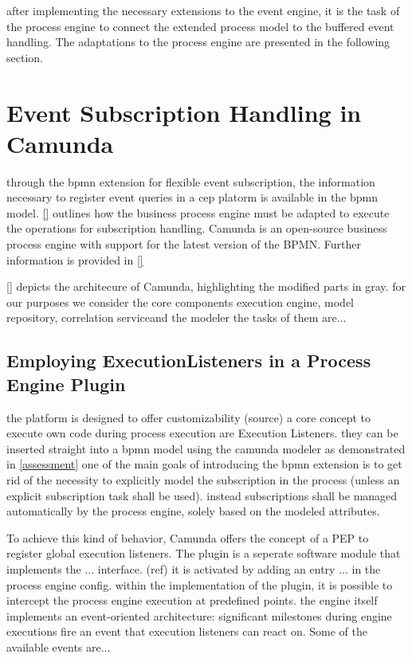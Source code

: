 after implementing the necessary extensions to the event engine, it is the task of the process engine to connect the extended process model to the buffered event handling.
The adaptations to the process engine are presented in the following section.

\section{Event Subscription Handling in Camunda}\label{ch:implcamunda}
through the bpmn extension for flexible event subscription, the information necessary to register event queries in a cep platorm is available in the bpmn model.
\autoref{} outlines how the business process engine must be adapted to execute the operations for subscription handling.
Camunda is an open-source business process engine with support for the latest version of the BPMN. Further information is provided in \autoref{}

\autoref{} depicts the architecure of Camunda, highlighting the modified parts in gray.
for our purposes we consider the core components execution engine, model repository, correlation serviceand the modeler
the tasks of them are...

\subsection{Employing ExecutionListeners in a Process Engine Plugin}
the platform is designed to offer customizability (source)
a core concept to execute own code during process execution are Execution Listeners.
they can be inserted straight into a bpmn model using the camunda modeler as demonstrated in \autoref{assessment}
one of the main goals of introducing the bpmn extension is to get rid of the necessity to explicitly model the subscription in the process (unless an explicit subscription task shall be used).
instead subscriptions shall be managed automatically by the process engine, solely based on the modeled attributes.

To achieve this kind of behavior, Camunda offers the concept of a \ac{PEP} to register global execution listeners.
The plugin is a seperate software module that implements the ... interface. (ref)
it is activated by adding an entry ... in the process engine config.
within the implementation of the plugin, it is possible to intercept the process engine execution at predefined points.
the engine itself implements an event-oriented architecture: significant milestones during engine executions fire an event that execution listeners can react on.
Some of the available events are...


